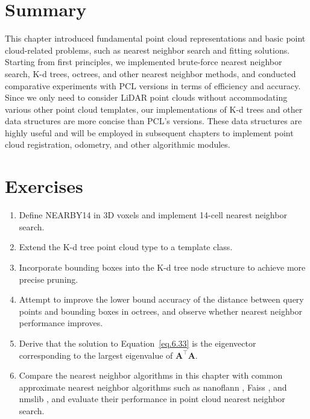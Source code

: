 \section{Summary}
This chapter introduced fundamental point cloud representations and basic point cloud-related problems, such as nearest neighbor search and fitting solutions. Starting from first principles, we implemented brute-force nearest neighbor search, K-d trees, octrees, and other nearest neighbor methods, and conducted comparative experiments with PCL versions in terms of efficiency and accuracy. Since we only need to consider LiDAR point clouds without accommodating various other point cloud templates, our implementations of K-d trees and other data structures are more concise than PCL's versions. These data structures are highly useful and will be employed in subsequent chapters to implement point cloud registration, odometry, and other algorithmic modules.

\section*{Exercises}
\begin{enumerate}
	\item Define NEARBY14 in 3D voxels and implement 14-cell nearest neighbor search.
	\item Extend the K-d tree point cloud type to a template class.
	\item Incorporate bounding boxes into the K-d tree node structure to achieve more precise pruning.
	\item Attempt to improve the lower bound accuracy of the distance between query points and bounding boxes in octrees, and observe whether nearest neighbor performance improves.
	\item Derive that the solution to Equation~\eqref{eq.6.33} is the eigenvector corresponding to the largest eigenvalue of $\mathbf{A}^\top \mathbf{A}$.
	\item Compare the nearest neighbor algorithms in this chapter with common approximate nearest neighbor algorithms such as nanoflann \cite{Blanco2014}, Faiss \cite{Johnson2019}, and nmslib \cite{Boytsov2016}, and evaluate their performance in point cloud nearest neighbor search.
\end{enumerate}